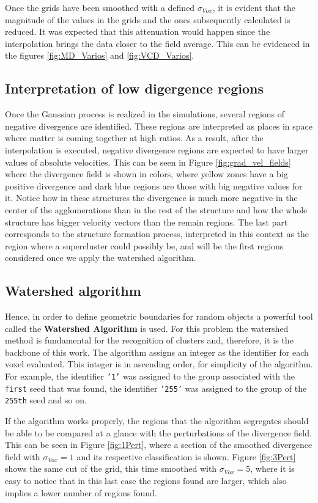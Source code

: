 \documentclass[usenatbib]{mnras}
\begin{document}
Once the grids have been smoothed with a defined $\sigma_{Vox}$, it is evident that the magnitude of the values in the grids and the ones subsequently calculated is reduced. It was expected that this attenuation would happen since the interpolation brings the data closer to the field average. This can be evidenced in the figures \ref{fig:MD_Varios} and \ref{fig:VCD_Varios}.

\subsection{Interpretation of low digergence regions}
Once the Gaussian process is realized in the simulations, several regions of negative divergence are identified. These regions are interpreted as places in space where matter is coming together at high ratios. As a result, after the interpolation is executed, negative divergence regions are expected to have larger values of absolute velocities. This can be seen in Figure \ref{fig:grad_vel_fields} where the divergence field is shown in colors, where yellow zones have a big positive divergence and dark blue regions are those with big negative values for it. Notice how in these structures the divergence is much more negative in the center of the agglomerations than in the rest of the structure and how the whole structure has bigger velocity vectors than the remain regions. The last part corresponds to the structure formation process, interpreted in this context as the region where a supercluster could possibly be, and will be the first regions considered once we apply the watershed algorithm.


\subsection{Watershed algorithm}
 Hence, in order to define geometric boundaries for random objects a powerful tool called  the \textbf{Watershed Algorithm} is used. For this problem the watershed method is fundamental for the recognition of clusters and, therefore, it is the backbone of this work. The algorithm assigns an integer as the identifier for each voxel evaluated. This integer is in ascending order, for simplicity of the algorithm. For example, the identifier \texttt{'1'} was assigned to the group associated with the \texttt{first} seed that was found, the identifier \texttt{'255'} was assigned to the group of the \texttt{255th} seed and so on. 
 
 If the algorithm works properly, the regions that the algorithm segregates should be able to be compared at a glance with the perturbations of the divergence field. This can be seen in Figure \ref{fig:1Pert}, where a section of the smoothed divergence field with $\sigma_{Vox} = 1$ and its respective classification is shown. Figure \ref{fig:3Pert} shows the same cut of the grid, this time smoothed with $\sigma_{Vox} = 5$, where it is easy to notice that in this last case the regions found are larger, which also implies a lower number of regions found.
 
\end{document}

